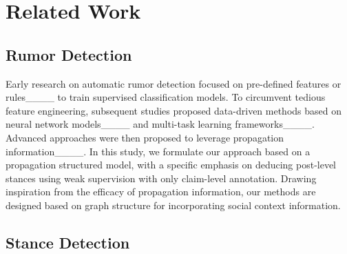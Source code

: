 \section{Related Work}
\vspace{-0.1cm}
\vspace{-0.1cm}
\subsection{Rumor Detection} 

Early research on automatic rumor detection focused on pre-defined features or rules____ to train supervised classification models. To circumvent tedious feature engineering, subsequent studies proposed data-driven methods based on neural network models____ and multi-task learning frameworks____. Advanced approaches were then proposed to leverage propagation information____. 
In this study, we formulate our approach based on a propagation structured model, with a specific emphasis on deducing post-level stances using weak supervision with only claim-level annotation. Drawing inspiration from the efficacy of propagation information, our methods are designed based on graph structure for incorporating social context information.

\subsection{Stance Detection} 


